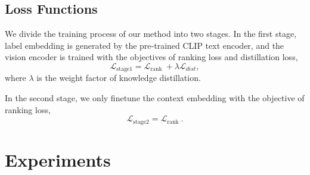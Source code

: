 \documentclass[letterpaper]{article} %
\begin{document}
\subsection{Loss Functions}
We divide the training process of our method into two stages.
In the first stage, label embedding is generated by the pre-trained CLIP text encoder, and the vision encoder is trained with the objectives of ranking loss and distillation loss,
\begin{equation}
\mathcal{L}_{\text {stage1}} = \mathcal{L}_{\text {rank }} + \lambda \mathcal{L}_{dist},
\end{equation}
where $\lambda$ is the weight factor of knowledge distillation. \par
In the second stage, we only finetune the context embedding with the objective of ranking loss,
\begin{equation}
\mathcal{L}_{\text {stage2}} = \mathcal{L}_{\text {rank }}.
\end{equation}

\section{Experiments}
\end{document}
